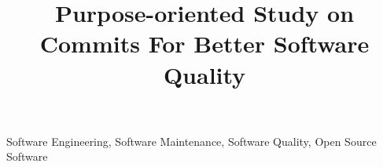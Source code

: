 \documentclass[10pt,conference]{IEEEtran}
\begin{document}
\title{Purpose-oriented Study on Commits For Better Software Quality}

\author{
}

\maketitle

\begin{abstract}

\end{abstract}

\begin{IEEEkeywords}
Software Engineering, Software Maintenance, Software Quality, Open Source Software
\end{IEEEkeywords}











\medskip



\vspace{12pt}
\color{red}
\end{document}
